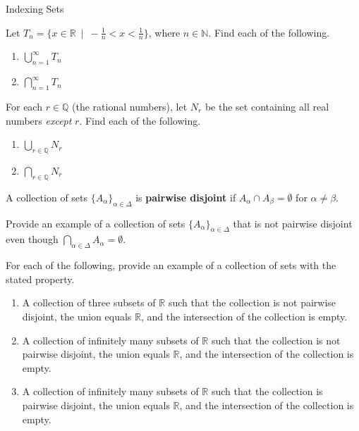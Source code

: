 \begin{section}{Indexing Sets}
\begin{problem}
Let $T_n = \{x \in \mathbb{R} \ \mid  \ -\frac{1}{n}<x< \frac{1}{n} \}$, where $n\in \mathbb{N}$.  Find each of the following.
\begin{enumerate}[label=\textrm{(\alph*)}]
\item $\displaystyle \bigcup_{n=1}^{\infty}T_n$
\item $\displaystyle \bigcap_{n=1}^{\infty}T_n$
\end{enumerate}
\end{problem}

\begin{problem}
For each $r\in\mathbb{Q}$ (the rational numbers), let $N_r$ be the set containing all real numbers \emph{except} $r$.  Find each of the following.
\begin{enumerate}[label=\textrm{(\alph*)}]
\item $\displaystyle \bigcup_{r\in\mathbb{Q}}N_r$
\item $\displaystyle \bigcap_{r\in\mathbb{Q}}N_r$
\end{enumerate}
\end{problem}

\begin{definition}
A collection of sets $\{A_{\alpha}\}_{\alpha\in\Delta}$ is \textbf{pairwise disjoint} if $A_{\alpha} \cap A_{\beta}=\emptyset$ for $\alpha\neq \beta$.
\end{definition}

\begin{problem}
Provide an example of a collection of sets $\{A_{\alpha}\}_{\alpha\in\Delta}$ that is not pairwise disjoint even though $\bigcap_{\alpha\in\Delta}A_{\alpha}=\emptyset$.
\end{problem}


\begin{problem}
For each of the following, provide an example of a collection of sets with the stated property.
\begin{enumerate}[label=\textrm{(\alph*)}]
\item A collection of three subsets of $\mathbb{R}$ such that the collection is not pairwise disjoint, the union equals $\mathbb{R}$, and the intersection of the collection is empty.
\item A collection of infinitely many subsets of $\mathbb{R}$ such that the collection is not pairwise disjoint, the union equals $\mathbb{R}$, and the intersection of the collection is empty.
\item A collection of infinitely many subsets of $\mathbb{R}$ such that the collection is pairwise disjoint, the union equals $\mathbb{R}$, and the intersection of the collection is empty.
\end{enumerate}
\end{problem}


\end{section}
